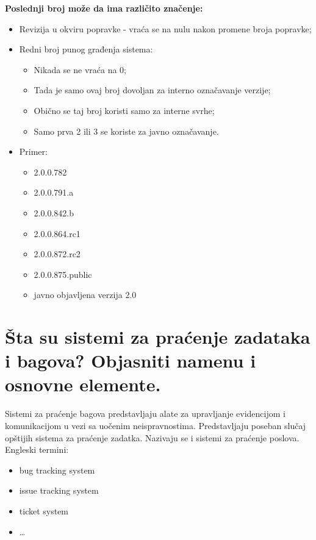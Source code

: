 \documentclass[a4paper]{article}
\begin{document}
  \textbf{Poslednji broj može da ima različito značenje:}
  \begin{itemize}
    \item Revizija u okviru popravke - vraća se na nulu nakon promene broja popravke;
    \item Redni broj punog građenja sistema:
          \begin{itemize}
            \item Nikada se ne vraća na 0;
            \item Tada je samo ovaj broj dovoljan za interno označavanje verzije;
            \item Obično se taj broj koristi samo za interne svrhe;
            \item Samo prva 2 ili 3 se koriste za javno označavanje.          
          \end{itemize}
    \item Primer:
      \begin{itemize}
        \item 2.0.0.782 
        \item 2.0.0.791.a 
        \item 2.0.0.842.b 
        \item 2.0.0.864.rc1 
        \item 2.0.0.872.rc2
        \item 2.0.0.875.public 
        \item javno objavljena verzija 2.0
      \end{itemize}
  \end{itemize}
  
\section{Šta su sistemi za praćenje zadataka i bagova? Objasniti namenu i osnovne elemente.}
  Sistemi za praćenje bagova predstavljaju alate za upravljanje evidencijom i komunikacijom u 
  vezi sa uočenim neispravnostima. Predstavljaju poseban slučaj opštijih sistema za praćenje zadatka. 
  Nazivaju se i sistemi za praćenje poslova. Engleski termini: 
  \begin{itemize}
    \item bug tracking system
    \item issue tracking system
    \item ticket system
    \item \dots
  \end{itemize}
  
\end{document}
